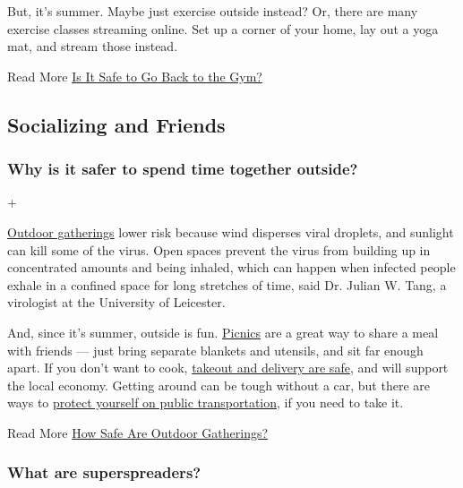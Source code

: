 But, it's summer. Maybe just exercise outside instead? Or, there are
many exercise classes streaming online. Set up a corner of your home,
lay out a yoga mat, and stream those instead.

Read More
\href{https://www.nytimes3xbfgragh.onion/2020/05/13/well/move/coronavirus-gym-safety.html}{Is
It Safe to Go Back to the Gym?}

\hypertarget{socializing-and-friends}{%
\subsection{Socializing and Friends}\label{socializing-and-friends}}

\hypertarget{why-is-it-safer-to-spend-time-together-outside}{%
\subsubsection{Why is it safer to spend time together
outside?}\label{why-is-it-safer-to-spend-time-together-outside}}

+

\href{https://www.nytimes3xbfgragh.onion/2020/05/15/us/coronavirus-what-to-do-outside.html}{Outdoor
gatherings} lower risk because wind disperses viral droplets, and
sunlight can kill some of the virus. Open spaces prevent the virus from
building up in concentrated amounts and being inhaled, which can happen
when infected people exhale in a confined space for long stretches of
time, said Dr. Julian W. Tang, a virologist at the University of
Leicester.

And, since it's summer, outside is fun.
\href{https://www.nytimes3xbfgragh.onion/2020/05/09/dining/coronavirus-how-to-have-a-picnic-safely.html}{Picnics}
are a great way to share a meal with friends --- just bring separate
blankets and utensils, and sit far enough apart. If you don't want to
cook,
\href{https://www.nytimes3xbfgragh.onion/2020/05/27/dining/takeout-delivery-safety-coronavirus.html}{takeout
and delivery are safe}, and will support the local economy. Getting
around can be tough without a car, but there are ways to
\href{https://www.nytimes3xbfgragh.onion/2020/06/08/nyregion/mta-subway-riding-health-coronavirus.html}{protect
yourself on public transportation}, if you need to take it.

Read More
\href{https://www.nytimes3xbfgragh.onion/2020/07/03/well/live/coronavirus-spread-outdoors-party.html}{How
Safe Are Outdoor Gatherings?}

\hypertarget{what-are-superspreaders}{%
\subsubsection{What are superspreaders?}\label{what-are-superspreaders}}

